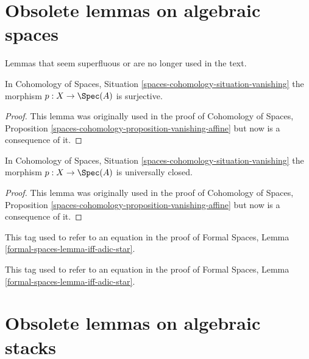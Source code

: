 \section{Obsolete lemmas on algebraic spaces}
\label{section-obsolete-on-spaces}

\noindent
Lemmas that seem superfluous or are no longer used in the text.

\begin{lemma}
\label{lemma-vanishing-surjective}
In Cohomology of Spaces, Situation \ref{spaces-cohomology-situation-vanishing}
the morphism $p : X \to \Spec(A)$ is surjective.
\end{lemma}

\begin{proof}
This lemma was originally used in the proof of
Cohomology of Spaces, Proposition
\ref{spaces-cohomology-proposition-vanishing-affine}
but now is a consequence of it.
\end{proof}

\begin{lemma}
\label{lemma-vanishing-universally-closed}
In Cohomology of Spaces, Situation \ref{spaces-cohomology-situation-vanishing}
the morphism $p : X \to \Spec(A)$ is universally closed.
\end{lemma}

\begin{proof}
This lemma was originally used in the proof of
Cohomology of Spaces, Proposition
\ref{spaces-cohomology-proposition-vanishing-affine}
but now is a consequence of it.
\end{proof}

\begin{remark}
\label{remark-equation-first}
This tag used to refer to an equation in the proof of
Formal Spaces, Lemma \ref{formal-spaces-lemma-iff-adic-star}.
\end{remark}

\begin{remark}
\label{remark-equation-second}
This tag used to refer to an equation in the proof of
Formal Spaces, Lemma \ref{formal-spaces-lemma-iff-adic-star}.
\end{remark}





\section{Obsolete lemmas on algebraic stacks}
\label{section-obsolete-on-stacks}

